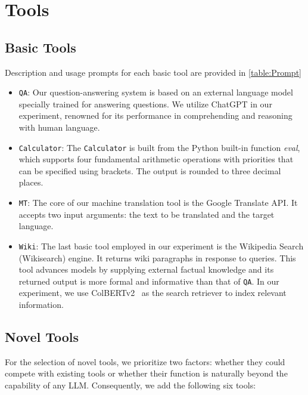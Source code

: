 \documentclass[11pt]{article}
\newcommand{\llm}{\textcolor{darkredTwo}{LLM}}
\newcommand{\calc}{{\tt Calculator}}
\newcommand{\mt}{{\tt MT}}
\newcommand{\qa}{{\tt QA}}
\newcommand{\wiki}{{\tt Wiki}}
\begin{document}
\section{Tools}
\label{Appendix:tools}
\subsection{Basic Tools}
Description and usage prompts for each basic tool are provided in \autoref{table:Prompt}

\begin{itemize}[leftmargin=0.1in]
    \item \qa{}: Our question-answering system is based on an external language model specially trained for answering questions. We utilize ChatGPT in our experiment, renowned for its performance in comprehending and reasoning with human language.
    \item \calc{}: The \calc{} is built from the Python built-in function \textit{eval}, which supports four fundamental arithmetic operations with priorities that can be specified using brackets. The output is rounded to three decimal places.
    \item \mt{}: The core of our machine translation tool is the Google Translate API. It accepts two input arguments: the text to be translated and the target language.
    \item \wiki{}: The last basic tool employed in our experiment is the Wikipedia Search (Wikisearch) engine. It returns wiki paragraphs in response to queries. This tool advances models by supplying external factual knowledge and its returned output is more formal and informative than that of \qa{}. In our experiment, we use ColBERTv2~\citep{santhanam2022colbertv2} as the search retriever to index relevant information.
\end{itemize}
\label{Appendix:basic tools}

\subsection{Novel Tools}
For the selection of novel tools, we prioritize two factors: whether they could compete with existing tools or whether their function is naturally beyond the capability of any \llm{}. Consequently, we add the following six tools:
\end{document}
